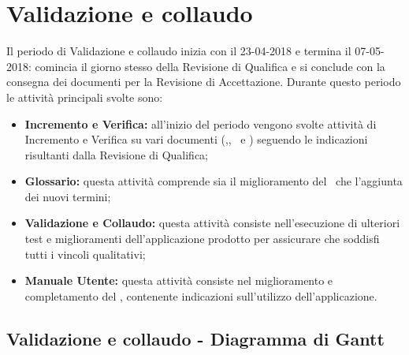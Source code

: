 \documentclass[PianoDiProgetto.tex]{subfiles}
\begin{document}
\section{Validazione e collaudo}
Il periodo di Validazione e collaudo inizia con il 23-04-2018 e termina il 07-05-2018: comincia il giorno stesso della Revisione di Qualifica e si conclude con la consegna dei documenti per la Revisione di Accettazione. Durante questo periodo le attività principali svolte sono:
\begin{itemize}
\item \textbf{Incremento e Verifica:} all’inizio del periodo vengono svolte attività di Incremento e Verifica su vari documenti (\ndp,\pdp, \pdq\ e \pb) seguendo le indicazioni risultanti dalla Revisione di Qualifica;
\item \textbf{Glossario:} questa attività comprende sia il miglioramento del \g\ che l’aggiunta dei nuovi termini;
\item \textbf{Validazione e Collaudo:} questa attività consiste nell’esecuzione di ulteriori test e miglioramenti dell'applicazione prodotto per assicurare che soddisfi tutti i vincoli qualitativi;
\item \textbf{Manuale Utente:} questa attività consiste nel miglioramento e completamento del \mut, contenente indicazioni sull’utilizzo dell'applicazione.
\end{itemize}
\begin{landscape}
\subsection{Validazione e collaudo - Diagramma di Gantt}
\end{landscape}	
\end{document}
